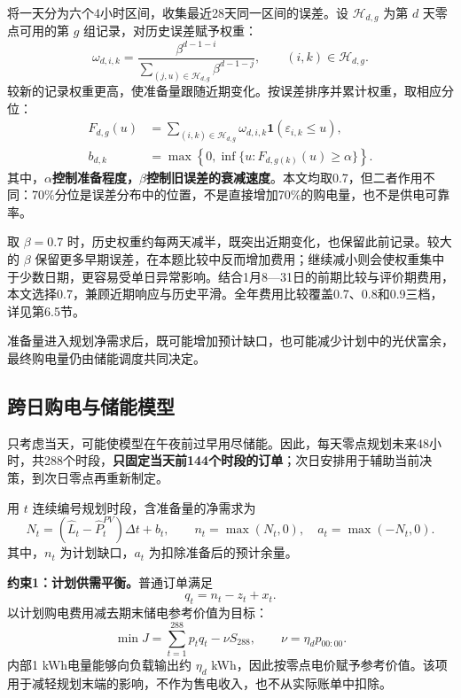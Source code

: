 将一天分为六个4小时区间，收集最近28天同一区间的误差。设 $\mathcal H_{d,g}$ 为第 $d$ 天零点可用的第 $g$ 组记录，对历史误差赋予权重：
\begin{equation}
\omega_{d,i,k}=\frac{\beta^{d-1-i}}{\displaystyle\sum_{(j,u)\in\mathcal H_{d,g}}\beta^{d-1-j}},\qquad (i,k)\in\mathcal H_{d,g}.
\label{eq:q2_weight}
\end{equation}
较新的记录权重更高，使准备量跟随近期变化。按误差排序并累计权重，取相应分位：
\begin{align}
F_{d,g}(u)&=\sum_{(i,k)\in\mathcal H_{d,g}}\omega_{d,i,k}\mathbf1(\varepsilon_{i,k}\le u),\label{eq:q2_cdf}\\
b_{d,k}&=\max\left\{0,\inf\{u:F_{d,g(k)}(u)\ge\alpha\}\right\}.\label{eq:q2_reserve}
\end{align}
其中，\textbf{$\alpha$控制准备程度，$\beta$控制旧误差的衰减速度}。本文均取0.7，但二者作用不同：70\%分位是误差分布中的位置，不是直接增加70\%的购电量，也不是供电可靠率。

取 $\beta=0.7$ 时，历史权重约每两天减半，既突出近期变化，也保留此前记录。较大的 $\beta$ 保留更多早期误差，在本题比较中反而增加费用；继续减小则会使权重集中于少数日期，更容易受单日异常影响。结合1月8—31日的前期比较与评价期费用，本文选择0.7，兼顾近期响应与历史平滑。全年费用比较覆盖0.7、0.8和0.9三档，详见第6.5节。

准备量进入规划净需求后，既可能增加预计缺口，也可能减少计划中的光伏富余，最终购电量仍由储能调度共同决定。

\subsection{跨日购电与储能模型}
只考虑当天，可能使模型在午夜前过早用尽储能。因此，每天零点规划未来48小时，共288个时段，\textbf{只固定当天前144个时段的订单}；次日安排用于辅助当前决策，到次日零点再重新制定。

用 $t$ 连续编号规划时段，含准备量的净需求为
\begin{equation}
N_t=(\widehat L_t-\widehat P^{PV}_t)\Delta t+b_t,\qquad
n_t=\max(N_t,0),\quad a_t=\max(-N_t,0).
\label{eq:q2_net_demand}
\end{equation}
其中，$n_t$ 为计划缺口，$a_t$ 为扣除准备后的预计余量。

\noindent\textbf{约束1：计划供需平衡。}普通订单满足
\begin{equation}
q_t=n_t-z_t+x_t.
\label{eq:q2_purchase}
\end{equation}
以计划购电费用减去期末储电参考价值为目标：
\begin{equation}
\min J=\sum_{t=1}^{288}p_tq_t-\nu S_{288},\qquad \nu=\eta_dp_{00:00}.
\label{eq:q2_objective}
\end{equation}
内部1 kWh电量能够向负载输出约 $\eta_d$ kWh，因此按零点电价赋予参考价值。该项用于减轻规划末端的影响，不作为售电收入，也不从实际账单中扣除。

